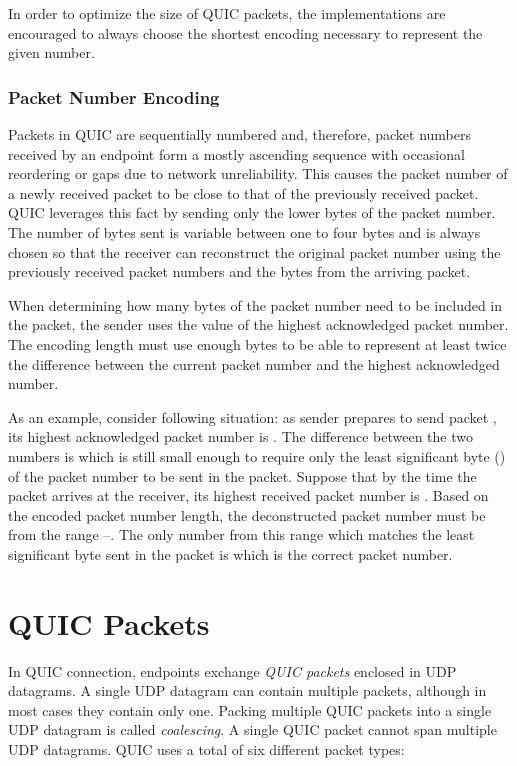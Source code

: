 In order to optimize the size of QUIC packets, the implementations are encouraged to always choose
the shortest encoding necessary to represent the given number.

\subsubsection{Packet Number Encoding}\label{sec:02-packet-number-encoding}

Packets in QUIC are sequentially numbered and, therefore, packet numbers received by an endpoint
form a mostly ascending sequence with occasional reordering or gaps due to network unreliability.
This causes the packet number of a newly received packet to be close to that of the previously
received packet. QUIC leverages this fact by sending only the lower bytes of the packet number. The
number of bytes sent is variable between one to four bytes and is always chosen so that the receiver
can reconstruct the original packet number using the previously received packet numbers and the
bytes from the arriving packet.

When determining how many bytes of the packet number need to be included in the packet, the sender
uses the value of the highest acknowledged packet number. The encoding length must use enough bytes
to be able to represent at least twice the difference between the current packet number and the
highest acknowledged number.

As an example, consider following situation: as sender prepares to send packet , its
highest acknowledged packet number is . The difference between the two numbers is
 which is still small enough to require only the least significant byte () of
the packet number to be sent in the packet. Suppose that by the time the packet arrives at the
receiver, its highest received packet number is . Based on the encoded packet number
length, the deconstructed packet number must be from the range --. The only
number from this range which matches the least significant byte sent in the packet is 
which is the correct packet number.

\section{QUIC Packets}

In QUIC connection, endpoints exchange \textit{QUIC packets} enclosed in UDP datagrams. A single UDP
datagram can contain multiple packets, although in most cases they contain only one. Packing
multiple QUIC packets into a single UDP datagram is called \textit{coalescing}. A single QUIC packet
cannot span multiple UDP datagrams. QUIC uses a total of six different packet types:

